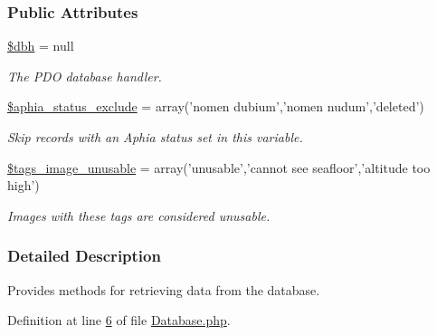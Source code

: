 \subsubsection*{Public Attributes}
\begin{DoxyCompactItemize}
\item 
\hypertarget{classDatabase_af7c7304034efe8fd0b7f9d8b8ad63acc}{\hyperlink{classDatabase_af7c7304034efe8fd0b7f9d8b8ad63acc}{\$dbh} = null}\label{classDatabase_af7c7304034efe8fd0b7f9d8b8ad63acc}

\begin{DoxyCompactList}\small\item\em The P\-D\-O database handler. \end{DoxyCompactList}\item 
\hypertarget{classDatabase_a502df1b3553fedfb4eb93788e9008294}{\hyperlink{classDatabase_a502df1b3553fedfb4eb93788e9008294}{\$aphia\-\_\-status\-\_\-exclude} = array('nomen dubium','nomen nudum','deleted')}\label{classDatabase_a502df1b3553fedfb4eb93788e9008294}

\begin{DoxyCompactList}\small\item\em Skip records with an Aphia status set in this variable. \end{DoxyCompactList}\item 
\hypertarget{classDatabase_aac282092ecb7f4f3862af28726d18f6e}{\hyperlink{classDatabase_aac282092ecb7f4f3862af28726d18f6e}{\$tags\-\_\-image\-\_\-unusable} = array('unusable','cannot see seafloor','altitude too high')}\label{classDatabase_aac282092ecb7f4f3862af28726d18f6e}

\begin{DoxyCompactList}\small\item\em Images with these tags are considered unusable. \end{DoxyCompactList}\end{DoxyCompactItemize}


\subsubsection{Detailed Description}
Provides methods for retrieving data from the database. 

Definition at line \hyperlink{Database_8php_source_l00006}{6} of file \hyperlink{Database_8php_source}{Database.\-php}.



